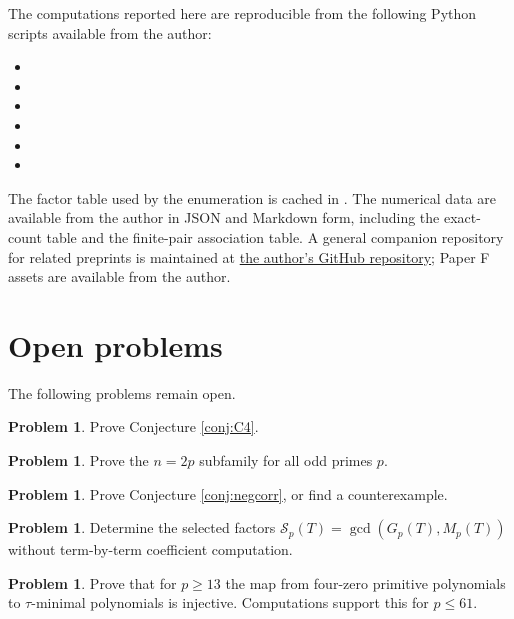 \documentclass[11pt]{article}
\theoremstyle{definition}
\newtheorem{problem}[theorem]{Problem}
\theoremstyle{remark}
\begin{document}
The computations reported here are reproducible from the following Python scripts available from the author:
\begin{itemize}
\item {}
\item {}
\item {}
\item {}
\item {}
\item {}
\end{itemize}
The factor table used by the enumeration is cached in . The numerical data are available from the author in JSON and Markdown form, including the exact-count table and the finite-pair association table. A general companion repository for related preprints is maintained at \href{https://github.com/63331849121/yijing-mathematical-structures}{the author's GitHub repository}; Paper F assets are available from the author.

\section{Open problems}
\label{sec:open}

The following problems remain open.

\begin{problem}
Prove Conjecture \ref{conj:C4}.
\end{problem}

\begin{problem}
Prove the $n=2p$ subfamily for all odd primes $p$.
\end{problem}

\begin{problem}
Prove Conjecture \ref{conj:negcorr}, or find a counterexample.
\end{problem}

\begin{problem}
Determine the selected factors $\mathcal S_p(T)=\gcd(G_p(T),M_p(T))$ without term-by-term coefficient computation.
\end{problem}

\begin{problem}
Prove that for $p\ge13$ the map from four-zero primitive polynomials to $\tau$-minimal polynomials is injective. Computations support this for $p\le61$.
\end{problem}
\end{document}
